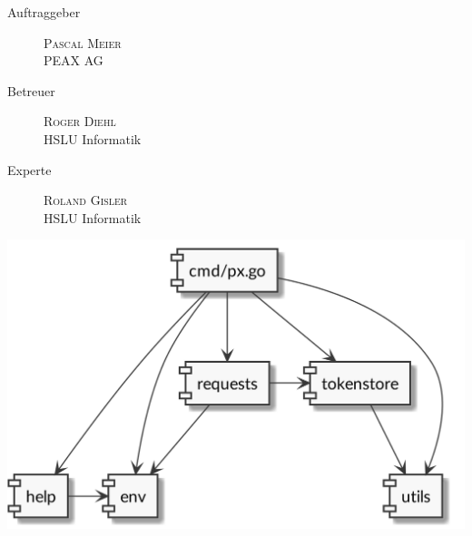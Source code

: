 \begin{multicols}{2}
    \begin{description}
        \item[Auftraggeber] \textsc{Pascal Meier}\\PEAX AG
        \item[Betreuer] \textsc{Roger Diehl}\\HSLU Informatik
        \item[Experte] \textsc{Roland Gisler}\\HSLU Informatik
    \end{description}
    \columnbreak
    \includegraphics[width=\linewidth]{pics/title.png}
\end{multicols}
